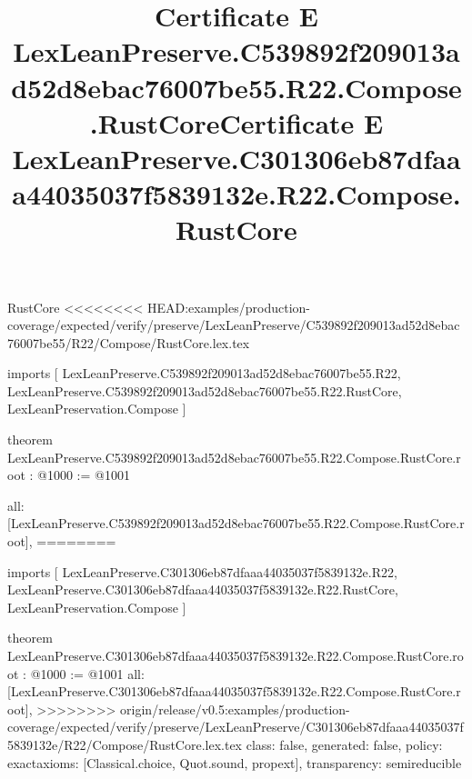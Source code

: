 \begin{lexlean}{RustCore}
<<<<<<<< HEAD:examples/production-coverage/expected/verify/preserve/LexLeanPreserve/C539892f209013ad52d8ebac76007be55/R22/Compose/RustCore.lex.tex
\title{Certificate E LexLeanPreserve.C539892f209013ad52d8ebac76007be55.R22.Compose.RustCore}
\begin{coremodule}
imports [
  LexLeanPreserve.C539892f209013ad52d8ebac76007be55.R22,
  LexLeanPreserve.C539892f209013ad52d8ebac76007be55.R22.RustCore,
  LexLeanPreservation.Compose
]

theorem LexLeanPreserve.C539892f209013ad52d8ebac76007be55.R22.Compose.RustCore.root : @1000 := @1001 {
  all: [LexLeanPreserve.C539892f209013ad52d8ebac76007be55.R22.Compose.RustCore.root],
========
\title{Certificate E LexLeanPreserve.C301306eb87dfaaa44035037f5839132e.R22.Compose.RustCore}
\begin{coremodule}
imports [
  LexLeanPreserve.C301306eb87dfaaa44035037f5839132e.R22,
  LexLeanPreserve.C301306eb87dfaaa44035037f5839132e.R22.RustCore,
  LexLeanPreservation.Compose
]

theorem LexLeanPreserve.C301306eb87dfaaa44035037f5839132e.R22.Compose.RustCore.root : @1000 := @1001 {
  all: [LexLeanPreserve.C301306eb87dfaaa44035037f5839132e.R22.Compose.RustCore.root],
>>>>>>>> origin/release/v0.5:examples/production-coverage/expected/verify/preserve/LexLeanPreserve/C301306eb87dfaaa44035037f5839132e/R22/Compose/RustCore.lex.tex
  class: false,
  generated: false,
  policy: exact{axioms: [Classical.choice, Quot.sound, propext]},
  transparency: semireducible
}


\end{coremodule}}
\end{coremodule}
\end{lexlean}
